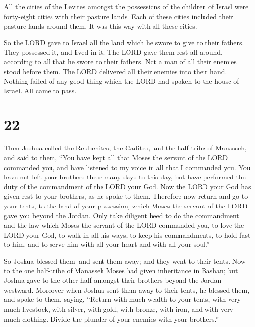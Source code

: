  All the cities of the Levites amongst the possessions of
the children of Israel were forty-eight cities with their pasture lands.
 Each of these cities included their pasture lands around
them. It was this way with all these cities.

 So the LORD gave to Israel all the land which he swore to
give to their fathers. They possessed it, and lived in it. 
The LORD gave them rest all around, according to all that he swore to
their fathers. Not a man of all their enemies stood before them. The
LORD delivered all their enemies into their hand.  Nothing
failed of any good thing which the LORD had spoken to the house of
Israel. All came to pass.

\hypertarget{section-21}{%
\section{22}\label{section-21}}

 Then Joshua called the Reubenites, the Gadites, and the
half-tribe of Manasseh,  and said to them, ``You have kept
all that Moses the servant of the LORD commanded you, and have listened
to my voice in all that I commanded you.  You have not left
your brothers these many days to this day, but have performed the duty
of the commandment of the LORD your God.  Now the LORD your
God has given rest to your brothers, as he spoke to them. Therefore now
return and go to your tents, to the land of your possession, which Moses
the servant of the LORD gave you beyond the Jordan.  Only
take diligent heed to do the commandment and the law which Moses the
servant of the LORD commanded you, to love the LORD your God, to walk in
all his ways, to keep his commandments, to hold fast to him, and to
serve him with all your heart and with all your soul.''

 So Joshua blessed them, and sent them away; and they went
to their tents.  Now to the one half-tribe of Manasseh Moses
had given inheritance in Bashan; but Joshua gave to the other half
amongst their brothers beyond the Jordan westward. Moreover when Joshua
sent them away to their tents, he blessed them,  and spoke
to them, saying, ``Return with much wealth to your tents, with very much
livestock, with silver, with gold, with bronze, with iron, and with very
much clothing. Divide the plunder of your enemies with your brothers.''

